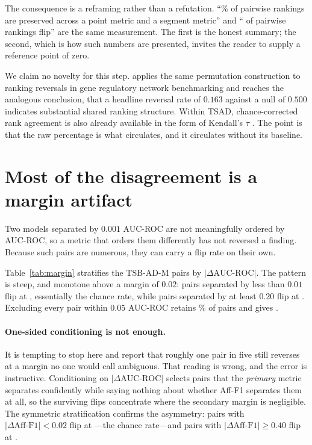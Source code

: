 \documentclass[twoside,11pt]{article}
\newcommand{\afff}{\mbox{Aff-F1}}
\newcommand{\auc}{\mbox{AUC-ROC}}
\begin{document}
The consequence is a reframing rather than a refutation. ``\TabAllAffAgreePct\%
of pairwise rankings are preserved across a point metric and a segment metric''
and ``\TabAllAffRate{} of pairwise rankings flip'' are the same measurement. The
first is the honest summary; the second, which is how such numbers are presented,
invites the reader to supply a reference point of zero.

We claim no novelty for this step. \citet{kendiukhov2026quantifying} applies the
same permutation construction to ranking reversals in gene regulatory network
benchmarking and reaches the analogous conclusion, that a headline reversal rate
of $0.163$ against a null of $0.500$ indicates substantial shared ranking
structure. Within TSAD, chance-corrected rank agreement is also already
available in the form of Kendall's $\tau$ \citep{lyu2026didwe}. The point is
that the raw percentage is what circulates, and it circulates without its
baseline.

\section{Most of the disagreement is a margin artifact}
\label{sec:margin}

Two models separated by $0.001$ \auc{} are not meaningfully ordered by \auc{},
so a metric that orders them differently has not reversed a finding. Because
such pairs are numerous, they can carry a flip rate on their own.

Table~\ref{tab:margin} stratifies the TSB-AD-M pairs by $|\Delta\auc{}|$. The
pattern is steep, and monotone above a margin of $0.02$: pairs separated by less than $0.01$ flip at
\TsbadGapZeroZeroToZeroOne{}, essentially the chance rate, while pairs separated
by at least $0.20$ flip at \TsbadGapTwoZeroToInf{}. Excluding every pair within
$0.05$ \auc{} retains \TsbadDropShareZeroFive\% of pairs and gives
\TsbadDropZeroFive{}.

\paragraph{One-sided conditioning is not enough.} It is tempting to stop here
and report that roughly one pair in five still reverses at a margin no one would
call ambiguous. That reading is wrong, and the error is instructive. Conditioning
on $|\Delta\auc{}|$ selects pairs that the \emph{primary} metric separates
confidently while saying nothing about whether \afff{} separates them at all, so
the surviving flips concentrate where the secondary margin is negligible. The
symmetric stratification confirms the asymmetry: pairs with
$|\Delta\afff{}| < 0.02$ flip at \TsbadSecZeroZeroToZeroTwo{}---the chance
rate---and pairs with $|\Delta\afff{}| \geq 0.40$ flip at
\TsbadSecFourZeroToInf{}.
\end{document}
